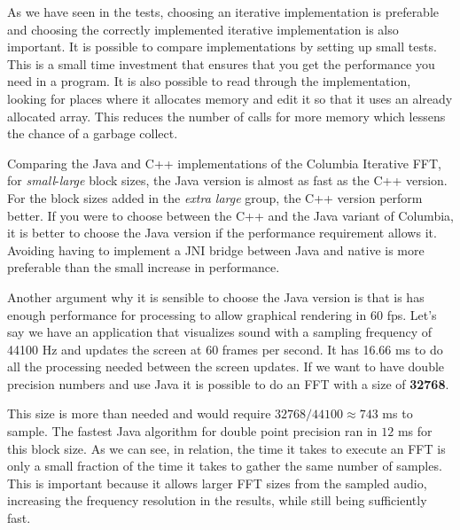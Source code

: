 
As we have seen in the tests, choosing an iterative implementation is preferable and choosing the correctly implemented iterative implementation is also important. It is possible to compare implementations by setting up small tests. This is a small time investment that ensures that you get the performance you need in a program. It is also possible to read through the implementation, looking for places where it allocates memory and edit it so that it uses an already allocated array. This reduces the number of calls for more memory which lessens the chance of a garbage collect.

Comparing the Java and C++ implementations of the Columbia Iterative FFT, for \emph{small}-\emph{large} block sizes, the Java version is almost as fast as the C++ version. For the block sizes added in the \emph{extra large} group, the C++ version perform better. If you were to choose between the C++ and the Java variant of Columbia, it is better to choose the Java version if the performance requirement allows it. Avoiding having to implement a JNI bridge between Java and native is more preferable than the small increase in performance.

Another argument why it is sensible to choose the Java version is that is has enough performance for processing to allow graphical rendering in 60 \gls{fps}. Let's say we have an application that visualizes sound with a sampling frequency of 44100 Hz and updates the screen at 60 frames per second. It has 16.66 ms to do all the processing needed between the screen updates. If we want to have double precision numbers and use Java it is possible to do an FFT with a size of \textbf{32768}.


This size is more than needed and would require $32768/44100\approx 743 $ ms to sample. The fastest Java algorithm for double point precision ran in $12$ ms for this block size. As we can see, in relation, the time it takes to execute an FFT is only a small fraction of the time it takes to gather the same number of samples. This is important because it allows larger FFT sizes from the sampled audio, increasing the frequency resolution in the results, while still being sufficiently fast.

